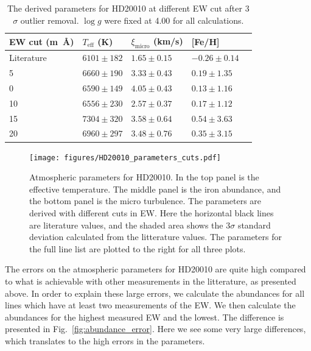 \documentclass{aa}
\begin{document}
\begin{table}[htb!]
    \caption{The derived parameters for HD20010 at different EW cut after 3$\sigma$ outlier removal.
    $\log g$ were fixed at 4.00 for all calculations.}
    \label{tab:hd20010}
    \centering
    \begin{tabular}{lllll}
      \hline\hline
        EW cut (\si{m\angstrom}) & $T_\mathrm{eff}$ (K) & $\xi_\mathrm{micro}$ (km/s)  & [Fe/H]           \\
      \hline
        Literature               & $6101 \pm 182$       & $1.65 \pm0.15$              & $-0.26 \pm 0.14$ \\
      \hline
               5                 & $6660 \pm 190$       & $3.33 \pm 0.43$              & $0.19 \pm 1.35$  \\
               0                 & $6590 \pm 149$       & $4.05 \pm 0.43$              & $0.13 \pm 1.16$  \\
              10                 & $6556 \pm 230$       & $2.57 \pm 0.37$              & $0.17 \pm 1.12$  \\
              15                 & $7304 \pm 320$       & $3.58 \pm 0.64$              & $0.54 \pm 3.63$  \\
              20                 & $6960 \pm 297$       & $3.48 \pm 0.76$              & $0.35 \pm 3.15$  \\
      \hline
    \end{tabular}
\end{table}



\begin{figure}[tpb!]
    \centering
    \texttt{[image: figures/HD20010\_parameters\_cuts.pdf]}
    \caption{Atmospheric parameters for HD20010. In the top panel is
    the effective temperature. The middle panel is the iron abundance,
    and the bottom panel is the micro turbulence. The parameters are
    derived with different cuts in EW. Here the horizontal black lines
    are literature values, and the shaded area shows the $3\sigma$ standard
    deviation calculated from the litterature values. The parameters for
    the full line list are plotted to the right for all three plots.}
    \label{fig:HD20010_parameters_cuts}
\end{figure}


The errors on the atmospheric parameters for HD20010 are quite high
compared to what is achievable with other measurements in the litterature,
as presented above. In order to explain these large errors, we calculate
the abundances for all lines which have at least two measurements of the EW.
We then calculate the abundances for the highest measured EW and the lowest.
The difference is presented in Fig.~\ref{fig:abundance_error}. Here we see
some very large differences, which translates to the high errors in the parameters.
\end{document}
